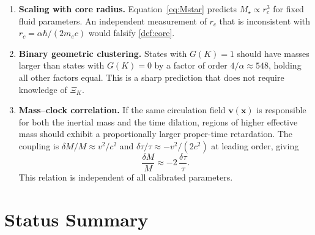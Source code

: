 \documentclass[11pt, a4paper]{article}
\newcommand{\rc}{r_c}        %
\begin{document}
\begin{enumerate}[label=(\roman*)]

  \item \textbf{Scaling with core radius.}
        Equation~\eqref{eq:Mstar} predicts $M_\star \propto \rc^3$
        for fixed fluid parameters.
        An independent measurement of $\rc$ that is inconsistent
        with $\rc = \alpha\hbar/(2m_e c)$ would falsify
        \cref{def:core}.

  \item \textbf{Binary geometric clustering.}
        States with $G(K)=1$ should have masses larger than
        states with $G(K)=0$ by a factor of order $4/\alpha \approx 548$,
        holding all other factors equal.
        This is a sharp prediction that does not require knowledge
        of $\Xi_K$.

  \item \textbf{Mass--clock correlation.}
        If the same circulation field $\mathbf{v}(\mathbf{x})$ is
        responsible for both the inertial mass and the time dilation,
        regions of higher effective mass should exhibit a proportionally
        larger proper-time retardation.
        The coupling is $\delta M / M \approx v^2/c^2$ and
        $\delta\tau/\tau \approx -v^2/(2c^2)$ at leading order, giving
        \begin{equation}
          \frac{\delta M}{M} \approx -2\,\frac{\delta\tau}{\tau}.
        \end{equation}
        This relation is independent of all calibrated parameters.

\end{enumerate}

\section{Status Summary}
\label{sec:status}
\end{document}
